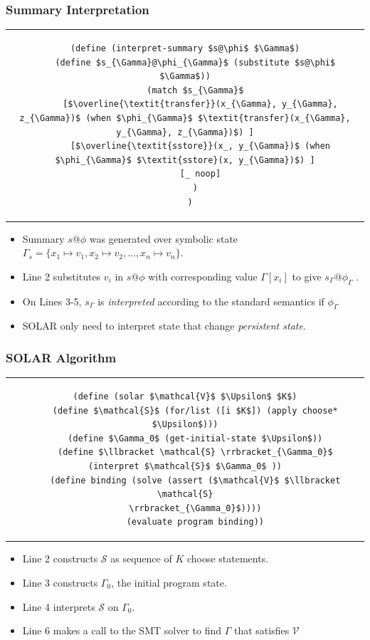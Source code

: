 \documentclass{beamer}
\newcommand{\transfer}{\overline{\textit{transfer}}}
\newcommand{\sstore}{\overline{\textit{sstore}}}
\begin{document}
\begin{frame}[fragile]
  \frametitle{Summary Interpretation}
    \begin{center}
      \begin{tabular}{c}
  \begin{lstlisting}[language=Racket,mathescape=true]
  (define (interpret-summary $s@\phi$ $\Gamma$)
    (define $s_{\Gamma}@\phi_{\Gamma}$ (substitute $s@\phi$ $\Gamma$))
    (match $s_{\Gamma}$
      [$\transfer(x_{\Gamma}, y_{\Gamma}, z_{\Gamma})$ (when $\phi_{\Gamma}$ $\textit{transfer}(x_{\Gamma}, y_{\Gamma}, z_{\Gamma})$) ]
      [$\sstore(x_, y_{\Gamma})$ (when $\phi_{\Gamma}$ $\textit{sstore}(x, y_{\Gamma})$) ]
      [_ noop]
    )
  )
  \end{lstlisting}
  \end{tabular}
    \end{center}

    \begin{itemize}
      \item Summary $s@\phi$ was generated over symbolic state $\Gamma_{s} = \{ x_1 \mapsto v_1, x_2
        \mapsto v_2, \dots, x_n \mapsto v_n \}$.
      \item Line 2 substitutes $v_i$ in $s@\phi$ with corresponding value
        $\Gamma[x_i]$ to give $s_{\Gamma}@\phi_{\Gamma}$ .
      \item On Lines 3-5, $s_\Gamma$ is \textit{interpreted} according to the standard
        semantics if $\phi_{\Gamma}$
      \item SOLAR only need to interpret state that change \textit{persistent state}.
    \end{itemize}
\end{frame}

\begin{frame}[fragile]
  \frametitle{SOLAR Algorithm}
    \begin{center}
      \begin{tabular}{c}
  \begin{lstlisting}[language=Racket,mathescape=true,basicstyle=\tiny]
  (define (solar $\mathcal{V}$ $\Upsilon$ $K$)
    (define $\mathcal{S}$ (for/list ([i $K$]) (apply choose* $\Upsilon$)))
    (define $\Gamma_0$ (get-initial-state $\Upsilon$))
    (define $\llbracket \mathcal{S} \rrbracket_{\Gamma_0}$ (interpret $\mathcal{S}$ $\Gamma_0$ ))
    (define binding (solve (assert ($\mathcal{V}$ $\llbracket \mathcal{S}
    \rrbracket_{\Gamma_0}$))))
    (evaluate program binding))
  \end{lstlisting}
  \end{tabular}
  \end{center}
  \begin{itemize}
    \item Line 2 constructs $\mathcal{S}$ as sequence of $K$ choose statements.
    \item Line 3 constructs $\Gamma_0$, the initial program state.
    \item Line 4 interprets $\mathcal{S}$ on $\Gamma_0$.
    \item Line 6 makes a call to the SMT solver to find $\Gamma$ that satisfies
      $\mathcal{V}$
  \end{itemize}
\end{frame}
\end{document}
